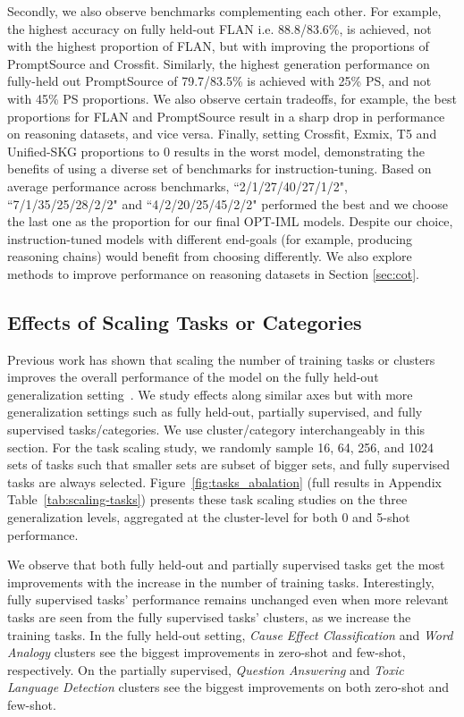 Secondly, we also observe benchmarks complementing each other. For example, the highest accuracy on fully held-out FLAN i.e. 88.8/83.6\%, is achieved, not with the highest proportion of FLAN, but with improving the proportions of PromptSource and Crossfit. Similarly, the highest generation performance on fully-held out PromptSource of 79.7/83.5\% is achieved with 25\% PS, and not with 45\% PS proportions. We also observe certain tradeoffs, for example, the best proportions for FLAN and PromptSource result in a sharp drop in performance on reasoning datasets, and vice versa. Finally, setting Crossfit, Exmix, T5 and Unified-SKG proportions to 0 results in the worst model, demonstrating the benefits of using a diverse set of benchmarks for instruction-tuning. Based on average performance across benchmarks, ``2/1/27/40/27/1/2", ``7/1/35/25/28/2/2" and ``4/2/20/25/45/2/2" performed the best and we choose the last one as the proportion for our final OPT-IML models. Despite our choice, instruction-tuned models with different end-goals (for example, producing reasoning chains) would benefit from choosing differently. We also explore methods to improve performance on reasoning datasets in Section \ref{sec:cot}.

\subsection{Effects of Scaling Tasks or Categories}
\label{subsec:scaling-tasks-clusters}

Previous work has shown that scaling the number of training tasks or clusters improves the overall performance of the model on the fully held-out generalization setting~\citep{wei2021flan,wang2022niv2}. We study effects along similar axes but with more generalization settings such as fully held-out, partially supervised, and fully supervised tasks/categories. We use cluster/category interchangeably in this section. For the task scaling study, we randomly sample 16, 64, 256, and 1024 sets of tasks such that smaller sets are subset of bigger sets, and fully supervised tasks are always selected. Figure~\ref{fig:tasks_abalation} (full results in Appendix Table~\ref{tab:scaling-tasks}) presents these task scaling studies on the three generalization levels, aggregated at the cluster-level for both 0 and 5-shot performance. 

We observe that both fully held-out and partially supervised tasks get the most improvements with the increase in the number of training tasks. Interestingly, fully supervised tasks' performance remains unchanged even when more relevant tasks are seen from the fully supervised tasks' clusters, as we increase the training tasks. In the fully held-out setting, \emph{Cause Effect Classification} and \emph{Word Analogy} clusters see the biggest improvements in zero-shot and few-shot, respectively. On the partially supervised, \emph{Question Answering} and \emph{Toxic Language Detection} clusters see the biggest improvements on both zero-shot and few-shot. 

